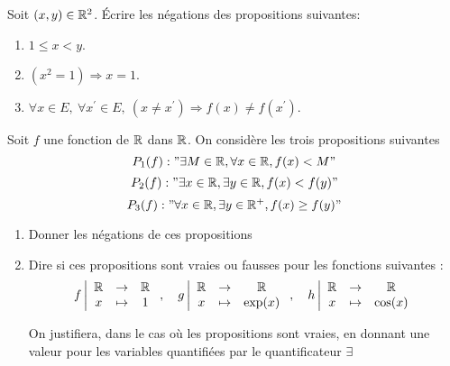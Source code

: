 \documentclass[a4paper, 11pt]{article}
\begin{document}
\begin{exercice}  \;
Soit $(x,y)\in\mathbb{R}^2$. \'Ecrire les n\'egations des propositions suivantes:
\begin{enumerate}
\item $1\leq x<y$.
\item $(x^2=1)\Longrightarrow x=1$.
\item $\forall x\in E,\ \forall x^{\prime}\in E,\ (x\not= x^{\prime})\Longrightarrow f(x)\not= f(x^{\prime})$.
\end{enumerate}
\end{exercice}
\begin{exercice}
Soit $f$ une fonction de $\mathbb{R}$ dans $\mathbb{R}$. On considère les trois propositions suivantes 
$$P_1(f) : "\exists M\in \mathbb{R}, \forall x \in \mathbb{R}, f(x) <M"$$
$$P_2(f) : "\exists x\in \mathbb{R}, \exists y \in \mathbb{R}, f(x) <f(y)"$$
$$P_3(f) : "\forall x\in \mathbb{R}, \exists y \in \mathbb{R}^+, f(x) \geq f(y)"$$

\begin{enumerate}
    \item Donner les négations de ces propositions
    \item Dire si ces propositions sont vraies ou fausses pour les fonctions suivantes :
    $$ f \left| \begin{array}{ccc}
         \mathbb{R} &\rightarrow &\mathbb{R}   \\
         x & \mapsto & 1
    \end{array}\right. ,\quad  g \left| \begin{array}{ccc}
         \mathbb{R} &\rightarrow &\mathbb{R}   \\
         x & \mapsto & \exp(x)
    \end{array}\right. ,\quad  h \left| \begin{array}{ccc}
         \mathbb{R} &\rightarrow &\mathbb{R}   \\
         x & \mapsto & \cos(x)
    \end{array}\right.$$

On justifiera, dans le cas où les propositions sont vraies, en donnant une valeur pour les variables quantifiées par le quantificateur $\exists$
    
\end{enumerate}
\end{exercice}
\end{document}

